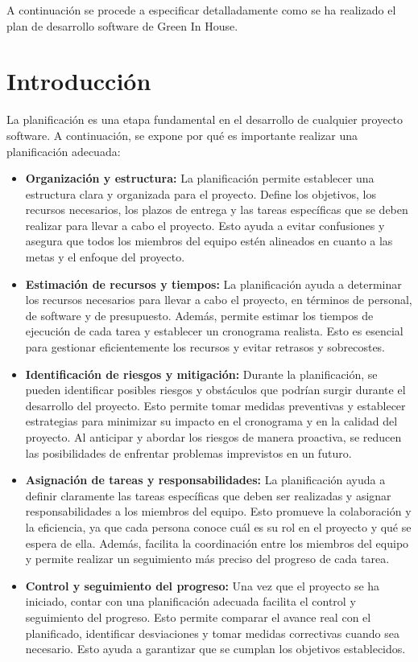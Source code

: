 A continuación se procede a especificar detalladamente como se ha realizado el plan de desarrollo software de Green In House.
\section{Introducción}
La planificación es una etapa fundamental en el desarrollo de cualquier proyecto software. A continuación, se expone por qué es importante realizar una planificación adecuada:
\begin{itemize}
    \item \textbf{Organización y estructura:} La planificación permite establecer una estructura clara y organizada para el proyecto. Define los objetivos, los recursos necesarios, los plazos de entrega y las tareas específicas que se deben realizar para llevar a cabo el proyecto. Esto ayuda a evitar confusiones y asegura que todos los miembros del equipo estén alineados en cuanto a las metas y el enfoque del proyecto.
    \item \textbf{Estimación de recursos y tiempos:} La planificación ayuda a determinar los recursos necesarios para llevar a cabo el proyecto, en términos de personal, de software y de presupuesto. Además, permite estimar los tiempos de ejecución de cada tarea y establecer un cronograma realista. Esto es esencial para gestionar eficientemente los recursos y evitar retrasos y sobrecostes.  
    \item \textbf{Identificación de riesgos y mitigación:} Durante la planificación, se pueden identificar posibles riesgos y obstáculos que podrían surgir durante el desarrollo del proyecto. Esto permite tomar medidas preventivas y establecer estrategias para minimizar su impacto en el cronograma y en la calidad del proyecto. Al anticipar y abordar los riesgos de manera proactiva, se reducen las posibilidades de enfrentar problemas imprevistos en un futuro.  
    \item \textbf{Asignación de tareas y responsabilidades:} La planificación ayuda a definir claramente las tareas específicas que deben ser realizadas y asignar responsabilidades a los miembros del equipo. Esto promueve la colaboración y la eficiencia, ya que cada persona conoce cuál es su rol en el proyecto y qué se espera de ella. Además, facilita la coordinación entre los miembros del equipo y permite realizar un seguimiento más preciso del progreso de cada tarea.
    \item \textbf{Control y seguimiento del progreso:} Una vez que el proyecto se ha iniciado, contar con una planificación adecuada facilita el control y seguimiento del progreso. Esto permite comparar el avance real con el planificado, identificar desviaciones y tomar medidas correctivas cuando sea necesario. Esto ayuda a garantizar que se cumplan los objetivos establecidos.
\end{itemize}

